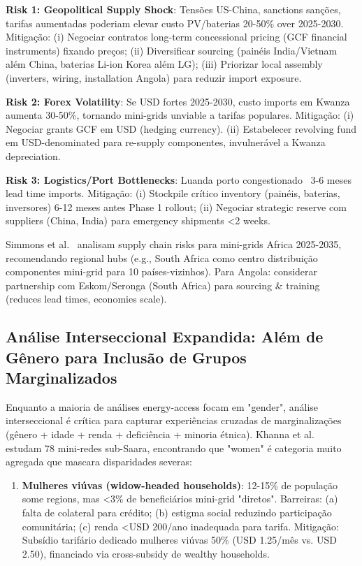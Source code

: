 \documentclass[12pt, a4paper]{article}
\begin{document}
{{{{{{{{{{{{\textbf{Risk 1: Geopolitical Supply Shock}: Tensões US-China, sanctions sanções, tarifas aumentadas poderiam elevar custo PV/baterias 20-50\% over 2025-2030. Mitigação: (i) Negociar contratos long-term concessional pricing (GCF financial instruments) fixando preços; (ii) Diversificar sourcing (painéis India/Vietnam além China, baterias Li-ion Korea além LG); (iii) Priorizar local assembly (inverters, wiring, installation Angola) para reduzir import exposure.

\textbf{Risk 2: Forex Volatility}: Se USD fortes 2025-2030, custo imports em Kwanza aumenta 30-50\%, tornando mini-grids unviable a tarifas populares. Mitigação: (i) Negociar grants GCF em USD (hedging currency). (ii) Estabelecer revolving fund em USD-denominated para re-supply componentes, invulnerável a Kwanza depreciation.

\textbf{Risk 3: Logistics/Port Bottlenecks}: Luanda porto congestionado ~3-6 meses lead time imports. Mitigação: (i) Stockpile crítico inventory (painéis, baterias, inversores) 6-12 meses antes Phase 1 rollout; (ii) Negociar strategic reserve com suppliers (China, India) para emergency shipments <2 weeks.

Simmons et al.~\citep{Simmons2025} analisam supply chain risks para mini-grids Africa 2025-2035, recomendando regional hubs (e.g., South Africa como centro distribuição componentes mini-grid para 10 países-vizinhos). Para Angola: considerar partnership com Eskom/Seronga (South Africa) para sourcing & training (reduces lead times, economies scale).

\subsection{Análise Interseccional Expandida: Além de Gênero para Inclusão de Grupos Marginalizados}

Enquanto a maioria de análises energy-access focam em "gender", análise interseccional é crítica para capturar experiências cruzadas de marginalizações (gênero + idade + renda + deficiência + minoria étnica). Khanna et al.~\citep{Khanna2025} estudam 78 mini-redes sub-Saara, encontrando que "women" é categoria muito agregada que mascara disparidades severas:

\begin{enumerate}
\item \textbf{Mulheres viúvas (widow-headed households)}: 12-15\% de população some regions, mas <3\% de beneficiários mini-grid "diretos". Barreiras: (a) falta de colateral para crédito; (b) estigma social reduzindo participação comunitária; (c) renda <USD 200/ano inadequada para tarifa. Mitigação: Subsídio tarifário dedicado mulheres viúvas 50\% (USD 1.25/mês vs. USD 2.50), financiado via cross-subsidy de wealthy households.


\end{enumerate}}}}}}}}}}}}}
\end{document}
